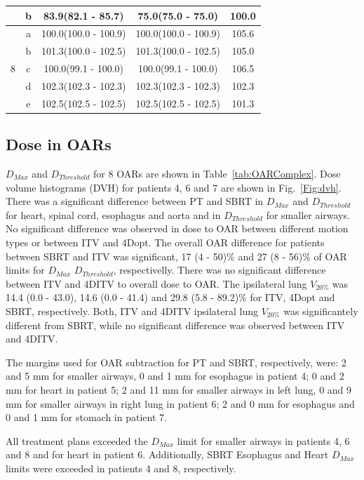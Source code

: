 \documentclass[type=dr, dr=rernat, accentcolor=tud7b,colorbacktitle, bigchapter, openright, twoside, 12pt ]{tudthesis}
\begin{document}
\begin{table}[H]
\begin{tabular}{c|c|c|c|c}
 & b & 83.9(82.1 - 85.7) & 75.0(75.0 - 75.0) & 100.0\\ 
 \hline
\multirow{5}{*}{8} & a & 100.0(100.0 - 100.9) & 100.0(100.0 - 100.9) & 105.6\\ 
 & b & 101.3(100.0 - 102.5) & 101.3(100.0 - 102.5) & 105.0\\ 
 & c & 100.0(99.1 - 100.0) & 100.0(99.1 - 100.0) & 106.5\\ 
 & d & 102.3(102.3 - 102.3) & 102.3(102.3 - 102.3) & 102.3\\ 
 & e & 102.5(102.5 - 102.5) & 102.5(102.5 - 102.5) & 101.3\\ 
\hline\hline
	\end{tabular}
	\label{tab:resultsComplex}
\end{table}

\subsection{Dose in OARs}

$D_{Max}$ and $D_{Threshold}$ for 8 OARs are shown in Table~\ref{tab:OARComplex}. Dose volume histograms (DVH) for patients 4, 6 and 7 are shown in Fig.~\ref{Fig:dvh}.
There was a significant difference between PT and SBRT in $D_{Max}$ and $D_{Threshold}$ 
for heart, spinal cord, esophagus and aorta and in $D_{Threshold}$ for smaller airways.
No significant difference was observed in dose to OAR between different motion types or between ITV and 4Dopt.
The overall OAR difference for patients between SBRT and ITV
was significant, 17 (4 - 50)\% and 27 (8 - 56)\% of OAR limits for $D_{Max}$ $D_{Threshold}$, respectivelly. There was no significant difference between ITV and 4DITV to overall dose to OAR.
The ipsilateral lung $V_{20\%}$ was 14.4 (0.0 - 43.0), 14.6 (0.0 - 41.4) and 29.8 (5.8 - 89.2)\% for ITV, 4Dopt and SBRT, respectively. Both, ITV and 4DITV ipsilateral lung $V_{20\%}$ was
significantely different from SBRT, while no significant difference was observed between ITV and 4DITV.

The margins used for OAR subtraction for PT and SBRT, respectively, were:
2 and 5 mm for smaller airways, 0 and 1 mm for esophagus in patient 4; 
0 and 2 mm for heart in patient 5; 
2 and 11 mm for smaller airways in left lung, 0 and 9 mm for smaller airways in right lung in patient 6;
2 and 0 mm for esophagus and 0 and 1 mm for stomach in patient 7.

All treatment plans exceeded the $D_{Max}$ limit for smaller airways in patients 4, 6 and 8 and for heart in patient 6. 
Additionally, SBRT Esophagus and Heart $D_{Max}$ limits were exceeded in patients 4 and 8, respectively.
\end{document}
